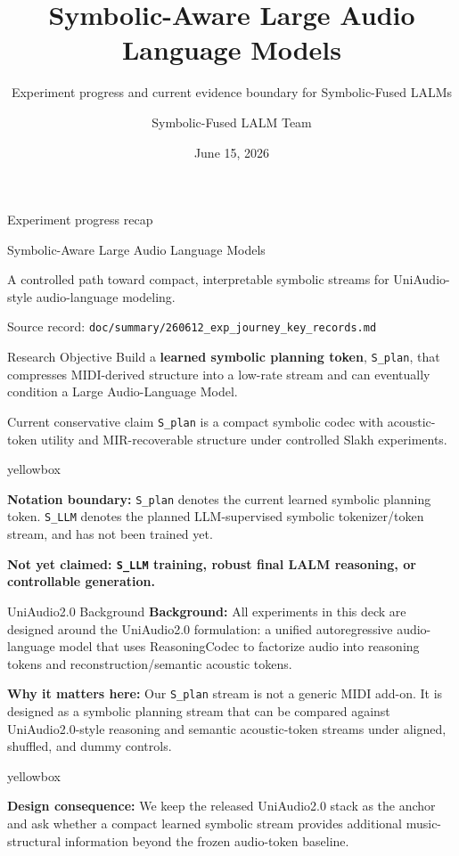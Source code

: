 \documentclass[aspectratio=169,11pt]{beamer}
\title{Symbolic-Aware Large Audio Language Models}
\subtitle{Experiment progress and current evidence boundary for Symbolic-Fused LALMs}
\author{Symbolic-Fused LALM Team}
\date{June 15, 2026}
\newcommand{\stage}[1]{{\color{deckaccent}\textbf{#1}}}
\newcommand{\missing}[1]{{\color{missingred}\textbf{#1}}}
\newcommand{\code}[1]{\texttt{\footnotesize #1}}
\newcommand{\expfield}[2]{\textbf{#1:} #2\par\vspace{0.10cm}}
\newenvironment{keybox}{%
  \begin{beamercolorbox}[rounded=true,sep=0.14cm,wd=\linewidth]{yellowbox}\footnotesize%
}{%
  \end{beamercolorbox}%
}
\begin{document}
\begin{frame}[plain]
  \vspace{0.8cm}
  {\Large\color{deckaccent}Experiment progress recap}\par
  \vspace{0.4cm}
  {\Huge Symbolic-Aware Large Audio Language Models\par}
  \vspace{0.45cm}
  {\Large\color{deckmuted}A controlled path toward compact, interpretable symbolic streams for UniAudio-style audio-language modeling.}\par
  \vfill
  {\small\color{deckmuted}Source record: \code{doc/summary/260612\_exp\_journey\_key\_records.md}}
\end{frame}

\begin{frame}{Research Objective}
  \large
  Build a \stage{learned symbolic planning token}, \code{S\_plan}, that compresses MIDI-derived structure into a low-rate stream and can eventually condition a Large Audio-Language Model.

  \vspace{0.55cm}
  \begin{block}{Current conservative claim}
    \code{S\_plan} is a compact symbolic codec with acoustic-token utility and MIR-recoverable structure under controlled Slakh experiments.
  \end{block}

  \vspace{0.18cm}
  \begin{keybox}
    \textbf{Notation boundary:} \code{S\_plan} denotes the current learned symbolic planning token. \code{S\_LLM} denotes the planned LLM-supervised symbolic tokenizer/token stream, and has not been trained yet.
  \end{keybox}

  \vspace{0.25cm}
  \missing{Not yet claimed: \code{S\_LLM} training, robust final LALM reasoning, or controllable generation.}
\end{frame}

\begin{frame}{UniAudio2.0 Background}
  \footnotesize
  \expfield{Background}{All experiments in this deck are designed around the UniAudio2.0 formulation: a unified autoregressive audio-language model that uses ReasoningCodec to factorize audio into reasoning tokens and reconstruction/semantic acoustic tokens.}
  \expfield{Why it matters here}{Our \code{S\_plan} stream is not a generic MIDI add-on. It is designed as a symbolic planning stream that can be compared against UniAudio2.0-style reasoning and semantic acoustic-token streams under aligned, shuffled, and dummy controls.}

  \begin{keybox}
    \textbf{Design consequence:} We keep the released UniAudio2.0 stack as the anchor and ask whether a compact learned symbolic stream provides additional music-structural information beyond the frozen audio-token baseline.
  \end{keybox}
\end{frame}
\end{document}
